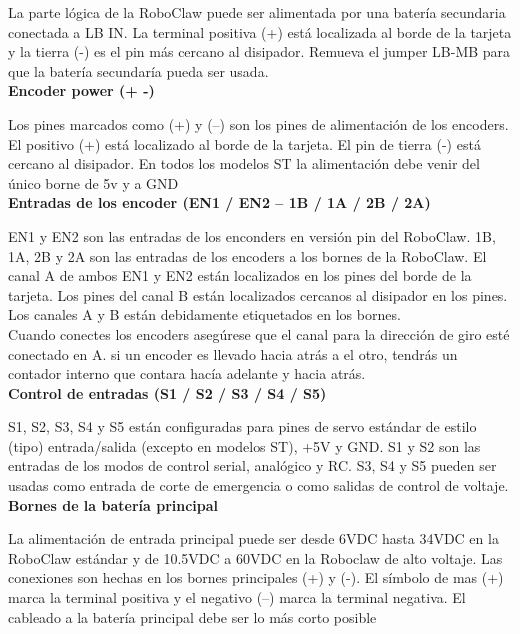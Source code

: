\documentclass[user_manual.tex]{subfiles}
\begin{document}
La parte lógica de la RoboClaw puede ser alimentada por una batería secundaria conectada a LB IN. La terminal positiva
(+) está localizada al borde de la tarjeta y la tierra (-) es el pin más cercano al disipador. Remueva el jumper LB-MB
para que la batería secundaría pueda ser usada.\\

\textbf{Encoder power (+ -)}

Los pines marcados como (+) y (–) son los pines de alimentación  de los encoders. El positivo (+) está localizado al
borde de la tarjeta. El pin de tierra (-) está cercano al disipador. En todos los modelos ST la alimentación debe venir del único borne de 5v  y a GND\\

\textbf{Entradas de los encoder (EN1 / EN2 – 1B / 1A / 2B / 2A)}
 
EN1 y EN2 son las entradas de los enconders en versión pin del RoboClaw. 1B, 1A, 2B y 2A son las entradas de los encoders
a los bornes de la RoboClaw. El canal A de ambos EN1 y EN2 están localizados en los pines del borde de la tarjeta.
Los pines del canal B están localizados cercanos al disipador en los pines. Los canales A y B están debidamente etiquetados
en los bornes.\\

Cuando conectes los encoders asegúrese que el canal para la dirección de giro esté conectado en A. si un encoder es
llevado hacia atrás a el otro, tendrás un contador interno que contara hacía adelante y hacia atrás. \\

\textbf{Control de entradas (S1 / S2 / S3 / S4 / S5)}

S1, S2, S3, S4 y S5 están configuradas para pines de servo estándar de estilo (tipo) entrada/salida (excepto en modelos ST), +5V y GND. S1 y S2 son las entradas  de los modos de control serial, analógico y RC. S3, S4 y S5 pueden ser usadas como entrada de corte de emergencia o como salidas de control de voltaje.\\

\textbf{Bornes de la batería principal}

La alimentación de entrada principal puede ser desde 6VDC hasta 34VDC en la RoboClaw estándar y de 10.5VDC a 60VDC en la Roboclaw
de alto voltaje. Las conexiones son hechas en los bornes principales (+) y (-). El símbolo de mas (+) marca la terminal
positiva y el negativo (–) marca la terminal negativa. El cableado a la batería principal debe ser lo más corto posible \\
\end{document}
